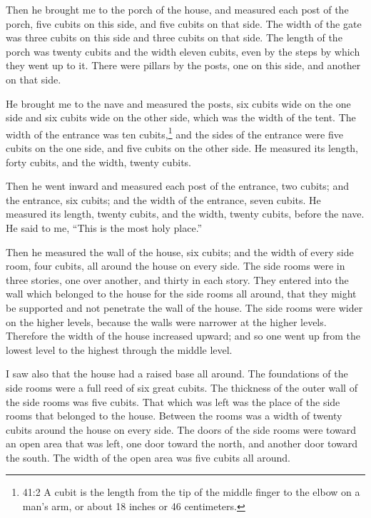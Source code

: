 \myverse{}Then he brought me to the porch of the house, and measured each
post of the porch, five cubits on this side, and five cubits on that side. The width of the gate was three
cubits on this side and three cubits on that side.
\myverse{}The length of the porch was twenty cubits and the width eleven cubits, even
by the steps by which they went up to it. There were pillars by the posts, one on this side, and another
on that side.


\mychapter{} \myverse*{}He brought me to the nave and measured the posts, six cubits wide
on the one side and six cubits wide on the other side, which was the width of the tent.
\myverse{}The width of the entrance was ten cubits,\footnote{41:2 A cubit is the length from the tip of the middle finger to the elbow on a man’s arm, or about
	18 inches or 46 centimeters.} and the sides of the entrance were five cubits on the one side,
and five cubits on the other side. He measured its length, forty cubits, and the width, twenty cubits.

\myverse{}Then he went inward and measured each post of the entrance, two
cubits; and the entrance, six cubits; and the width of the entrance, seven cubits.
\myverse{}He measured its length, twenty cubits, and the width, twenty cubits, before
the nave. He said to me, “This is the most holy place.”

\myverse{}Then he measured the wall of the house, six cubits; and the width
of every side room, four cubits, all around the house on every side.
\myverse{}The side rooms were in three stories, one over another, and thirty in each
story. They entered into the wall which belonged to the house for the side rooms all around, that they
might be supported and not penetrate the wall of the house.
\myverse{}The side rooms were wider on the higher levels, because the walls were narrower
at the higher levels. Therefore the width of the house increased upward; and so one went up from the lowest
level to the highest through the middle level.

\myverse{}I saw also that the house had a raised base all around. The foundations
of the side rooms were a full reed of six great cubits.
\myverse{}The thickness of the outer wall of the side rooms was five cubits. That which
was left was the place of the side rooms that belonged to the house.
\myverse{}Between the rooms was a width of twenty cubits around the house on every
side.
\myverse{}The doors of the side rooms were toward an open area that was left, one door
toward the north, and another door toward the south. The width of the open area was five cubits all around.


